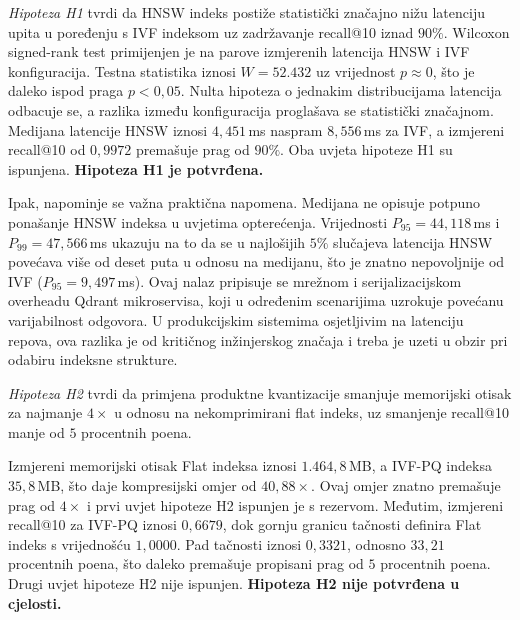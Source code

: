 \emph{Hipoteza H1} tvrdi da \foreignlanguage{english}{HNSW}
indeks postiže statistički značajno nižu latenciju
upita u poređenju s \foreignlanguage{english}{IVF}
indeksom uz zadržavanje
\foreignlanguage{english}{recall@10} iznad $90\%$.
Wilcoxon \foreignlanguage{english}{signed-rank} test
primijenjen je na parove izmjerenih latencija
\foreignlanguage{english}{HNSW} i
\foreignlanguage{english}{IVF} konfiguracija.
Testna statistika iznosi $W = 52{.}432$ uz
vrijednost $p \approx 0$, što je daleko ispod praga
$p < 0{,}05$. Nulta hipoteza o jednakim
distribucijama latencija odbacuje se, a razlika
između konfiguracija proglašava se statistički
značajnom.
Medijana latencije \foreignlanguage{english}{HNSW}
iznosi $4{,}451$\,ms naspram $8{,}556$\,ms za
\foreignlanguage{english}{IVF}, a izmjereni
\foreignlanguage{english}{recall@10} od $0{,}9972$
premašuje prag od $90\%$.
Oba uvjeta hipoteze H1 su ispunjena.
\textbf{Hipoteza H1 je potvrđena.}

Ipak, napominje se važna praktična napomena.
Medijana ne opisuje potpuno ponašanje
\foreignlanguage{english}{HNSW} indeksa u uvjetima
opterećenja. Vrijednosti $P_{95} = 44{,}118$\,ms i
$P_{99} = 47{,}566$\,ms ukazuju na to da se u
najlošijih $5\%$ slučajeva latencija
\foreignlanguage{english}{HNSW} povećava više od
deset puta u odnosu na medijanu, što je znatno
nepovoljnije od \foreignlanguage{english}{IVF}
($P_{95} = 9{,}497$\,ms).
Ovaj nalaz pripisuje se mrežnom i
serijalizacijskom overheadu
\foreignlanguage{english}{Qdrant} mikroservisa,
koji u određenim scenarijima uzrokuje povećanu
varijabilnost odgovora. U produkcijskim sistemima
osjetljivim na latenciju repova, ova razlika
je od kritičnog inžinjerskog značaja i treba
je uzeti u obzir pri odabiru indeksne strukture.

\emph{Hipoteza H2} tvrdi da primjena produktne
kvantizacije smanjuje memorijski otisak za
najmanje $4\times$ u odnosu na nekomprimirani
\foreignlanguage{english}{flat} indeks, uz
smanjenje \foreignlanguage{english}{recall@10}
manje od $5$ procentnih poena.

Izmjereni memorijski otisak
\foreignlanguage{english}{Flat} indeksa iznosi
$1{.}464{,}8$\,MB, a
\foreignlanguage{english}{IVF-PQ} indeksa
$35{,}8$\,MB, što daje kompresijski omjer od
$40{,}88\times$. Ovaj omjer znatno premašuje
prag od $4\times$ i prvi uvjet hipoteze H2
ispunjen je s rezervom.
Međutim, izmjereni \foreignlanguage{english}%
{recall@10} za \foreignlanguage{english}{IVF-PQ}
iznosi $0{,}6679$, dok gornju granicu tačnosti
definira \foreignlanguage{english}{Flat} indeks
s vrijednošću $1{,}0000$.
Pad tačnosti iznosi $0{,}3321$, odnosno
$33{,}21$ procentnih poena, što daleko premašuje
propisani prag od $5$ procentnih poena.
Drugi uvjet hipoteze H2 nije ispunjen. \textbf{Hipoteza H2 nije potvrđena u cjelosti.}

